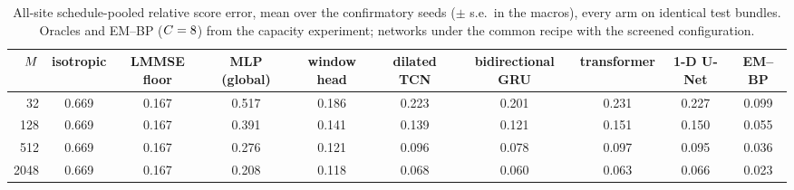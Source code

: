 \begin{table}[t]\centering\small
\caption{All-site schedule-pooled relative score error, mean over the confirmatory seeds ($\pm$ s.e.\ in the macros), every arm on identical test bundles. Oracles and EM--BP ($C=8$) from the capacity experiment; networks under the common recipe with the screened configuration.}
\label{tab:baselines}
\begin{tabular}{rccccccccc}
\toprule
$M$ & isotropic & LMMSE floor & MLP (global) & window head & dilated TCN & bidirectional GRU & transformer & 1-D U-Net & EM--BP \\
\midrule
32 & 0.669 & 0.167 & 0.517 & 0.186 & 0.223 & 0.201 & 0.231 & 0.227 & 0.099 \\
128 & 0.669 & 0.167 & 0.391 & 0.141 & 0.139 & 0.121 & 0.151 & 0.150 & 0.055 \\
512 & 0.669 & 0.167 & 0.276 & 0.121 & 0.096 & 0.078 & 0.097 & 0.095 & 0.036 \\
2048 & 0.669 & 0.167 & 0.208 & 0.118 & 0.068 & 0.060 & 0.063 & 0.066 & 0.023 \\
\bottomrule
\end{tabular}
\end{table}
